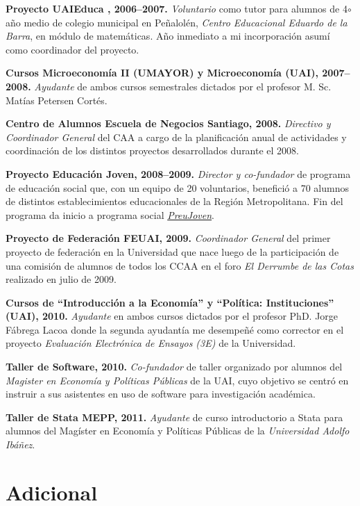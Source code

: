 \documentclass[letterpaper, 12pt]{article}
\renewenvironment{itemize}{
  \begin{list}{}{
    \setlength{\leftmargin}{0.45cm}
  }
}{
  \end{list}
}
\begin{document}
\begin{itemize}
\item \textbf{Proyecto UAIEduca , 2006--2007.} \emph{Voluntario} como tutor para alumnos de 4$\circ$ año medio de colegio municipal en Peñalolén, \emph{Centro Educacional Eduardo de la Barra}, en módulo de matemáticas. Año inmediato a mi incorporación asumí como coordinador del proyecto.
\item \textbf{Cursos Microeconomía II (UMAYOR) y Microeconomía (UAI), 2007--2008.} \emph{Ayudante} de ambos cursos semestrales dictados por el profesor M. Sc. Matías Petersen Cortés.
\item \textbf{Centro de Alumnos Escuela de Negocios Santiago, 2008.} \emph{Directivo y Coordinador General} del CAA a cargo de la planificación anual de actividades y coordinación de los distintos proyectos desarrollados durante el 2008.
\item \textbf{Proyecto Educación Joven, 2008--2009.} \emph{Director y co-fundador} de programa de educación social que, con un equipo de 20 voluntarios, benefició a 70 alumnos de distintos establecimientos educacionales de la Región Metropolitana. Fin del programa da inicio a programa social \href{http://www.preujoven.cl}{\emph {PreuJoven}}.
\item \textbf{Proyecto de Federación FEUAI, 2009.} \emph{Coordinador General} del primer proyecto de federación en la Universidad que nace luego de la participación de una comisión de alumnos de todos los CCAA en el foro \emph{El Derrumbe de las Cotas} realizado en julio de 2009.
\item \textbf{Cursos de ``Introducción a la Economía'' y ``Política: Instituciones'' (UAI), 2010.} \emph{Ayudante} en ambos cursos dictados por el profesor PhD. Jorge Fábrega Lacoa donde la segunda ayudantía me desempeñé como corrector en el proyecto \emph{Evaluación Electrónica de Ensayos (3E)} de la Universidad.
\item \textbf{Taller de Software, 2010.} \emph{Co-fundador} de taller organizado por alumnos del \emph{Magister en Economía y Políticas Públicas} de la UAI, cuyo objetivo se centró en instruir a sus asistentes en uso de software para investigación académica.
\item \textbf{Taller de Stata MEPP, 2011.} \emph{Ayudante} de curso introductorio a Stata para alumnos del Magíster en Economía y Políticas Públicas de la \emph{Universidad Adolfo Ibáñez}.
\end{itemize}

\section*{Adicional}
\end{document}
